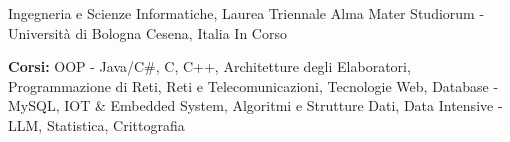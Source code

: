 

\begin{cventries}

  \cventry
    {Ingegneria e Scienze Informatiche, Laurea Triennale} %
    {Alma Mater Studiorum - Università di Bologna} %
    {Cesena, Italia} %
    {In Corso} %
    {
      \begin{cvitems} %
        \item {\textbf{Corsi:} OOP - Java/C\#, C, C++, Architetture degli Elaboratori, Programmazione di Reti, Reti e Telecomunicazioni, Tecnologie Web, Database - MySQL, IOT \& Embedded System, Algoritmi e Strutture Dati, Data Intensive - LLM, Statistica, Crittografia}
      \end{cvitems}
    }
    
\end{cventries}
